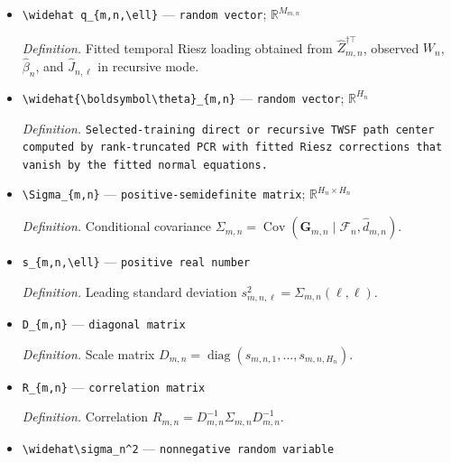 \documentclass{article}
\begin{document}
\begin{itemize}
  \par\smallskip\noindent\emph{Definition.} Fitted unit-side Riesz loading obtained from the selected rank-truncated unit design and observed \(W_n\).
  \item \texttt{\textbackslash{}\allowbreak{}widehat q\_\allowbreak{}\{m,\allowbreak{}n,\allowbreak{}\textbackslash{}\allowbreak{}ell\}\allowbreak{}} --- \texttt{random vector}; \(\mathbb R^{M_{m,n}}\)
  \par\smallskip\noindent\emph{Definition.} Fitted temporal Riesz loading obtained from \(\widehat Z_{m,n}^{\dagger\top}\), observed \(W_n\), \(\widehat\beta_n\), and \(\widehat J_{n,\ell}\) in recursive mode.
  \item \texttt{\textbackslash{}\allowbreak{}widehat\{\textbackslash{}\allowbreak{}boldsymbol\textbackslash{}\allowbreak{}theta\}\allowbreak{}\_\allowbreak{}\{m,\allowbreak{}n\}\allowbreak{}} --- \texttt{random vector}; \(\mathbb R^{H_n}\)
  \par\smallskip\noindent\emph{Definition.} \texttt{Selected-\allowbreak{}training direct or recursive TWSF path center computed by rank-\allowbreak{}truncated PCR with fitted Riesz corrections that vanish by the fitted normal equations.}
  \item \texttt{\textbackslash{}\allowbreak{}Sigma\_\allowbreak{}\{m,\allowbreak{}n\}\allowbreak{}} --- \texttt{positive-\allowbreak{}semidefinite matrix}; \(\mathbb R^{H_n\times H_n}\)
  \par\smallskip\noindent\emph{Definition.} Conditional covariance \(\Sigma_{m,n}=\operatorname{Cov}(\boldsymbol G_{m,n}\mid\mathcal F_n,\widehat d_{m,n})\).
  \item \texttt{s\_\allowbreak{}\{m,\allowbreak{}n,\allowbreak{}\textbackslash{}\allowbreak{}ell\}\allowbreak{}} --- \texttt{positive real number}
  \par\smallskip\noindent\emph{Definition.} Leading standard deviation \(s_{m,n,\ell}^2=\Sigma_{m,n}(\ell,\ell)\).
  \item \texttt{D\_\allowbreak{}\{m,\allowbreak{}n\}\allowbreak{}} --- \texttt{diagonal matrix}
  \par\smallskip\noindent\emph{Definition.} Scale matrix \(D_{m,n}=\operatorname{diag}(s_{m,n,1},\ldots,s_{m,n,H_n})\).
  \item \texttt{R\_\allowbreak{}\{m,\allowbreak{}n\}\allowbreak{}} --- \texttt{correlation matrix}
  \par\smallskip\noindent\emph{Definition.} Correlation \(R_{m,n}=D_{m,n}^{-1}\Sigma_{m,n}D_{m,n}^{-1}\).
  \item \texttt{\textbackslash{}\allowbreak{}widehat\textbackslash{}\allowbreak{}sigma\_\allowbreak{}n\textasciicircum{}2} --- \texttt{nonnegative random variable}

\end{itemize}
\end{document}
